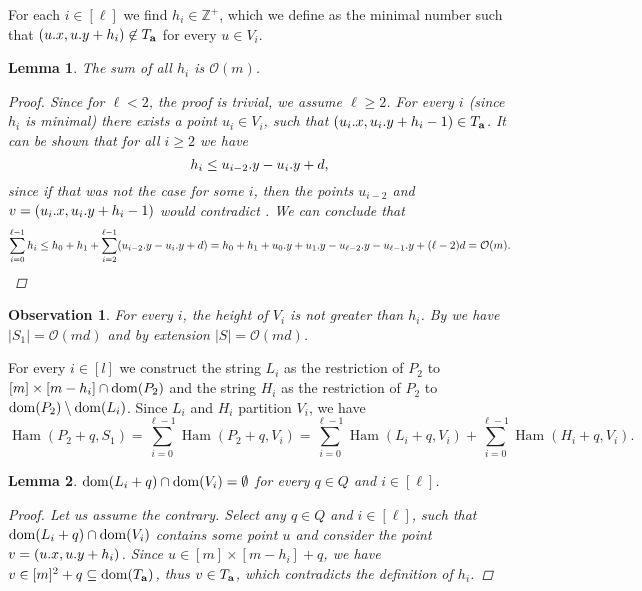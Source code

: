 \documentclass[11pt]{article}
\newcommand{\Z}{\mathbb{Z}}
\renewcommand{\O}{\mathcal{O}}
\theoremstyle{plain}
\newtheorem{lemma}{Lemma}
\newtheorem{observation}{Observation}
\theoremstyle{definition}
\theoremstyle{remark}
\DeclareMathOperator*{\Ham}{Ham}
\begin{document}
For each $i \in [\ell]$ we find $h_i \in \Z^+$, which we define as the minimal number such that $(u.x, u.y + h_i) \not \in T_\mathbf{a}$ for every $u \in V_i$.

\begin{lemma}\label{sum_of_h}
	The sum of all $h_i$ is $\O(m)$.
	\begin{proof}
		Since for $\ell < 2$, the proof is trivial, we assume $\ell \ge 2$.
		For every $i$ (since $h_i$ is minimal) there exists a point $u_i \in V_i$, such that $(u_i.x, u_i.y + h_i - 1) \in T_\mathbf{a}$.
		It can be shown that for all $i \ge 2$ we have
		$$ h_{i} \le u_{i - 2}.y - u_{i}.y + d,$$
		since if that was not the case for some $i$, then the points $u_{i - 2}$ and $v = (u_{i}.x, u_{i}.y + h_{i} - 1)$ would contradict .
		We can conclude that
		$$
			\sum_{i = 0}^{\ell - 1} h_i
			\le h_0 + h_1 + \sum_{i = 2}^{\ell - 1} (\y{u_{i - 2}} - \y{u_i} + d)
			= h_0 + h_1 + \y{u_0} + \y{u_1} - \y{u_{\ell - 2}} - \y{u_{\ell - 1}} + (\ell - 2)d 
			= \O(m).
		$$
	\end{proof}
\end{lemma}


\begin{observation}\label{area_bound}
	For every $i$, the height of $V_i$ is not greater than $h_i$.
	By  we have $|S_1| = \O(md)$ and by extension $|S| = \O(md)$.
\end{observation}


For every $i \in [l]$ we construct the string $L_i$ as the restriction of $P_2$ to $[m] \times [m - h_i] \cap \operatorname*{dom}(P_2)$
and the string $H_i$ as the restriction of $P_2$ to $\operatorname*{dom}(P_2) \setminus \operatorname*{dom}(L_i)$.
Since $L_i$ and $H_i$ partition $V_i$, we have
$$ \Ham(P_2 + q, S_1) = \sum_{i = 0}^{\ell - 1} \Ham(P_2 + q, V_i) = \sum_{i = 0}^{\ell - 1} \Ham(L_i + q, V_i) + \sum_{i = 0}^{\ell - 1} \Ham(H_i + q, V_i). $$

\begin{lemma}\label{pattern_height_reduction}
	$\operatorname*{dom}(L_i + q) \cap \operatorname*{dom}(V_i) = \emptyset$ for every $q \in Q$ and $i \in [\ell]$.
	\begin{proof}
		Let us assume the contrary.
		Select any $q \in Q$ and $i \in [\ell]$, such that $\operatorname*{dom}(L_i + q) \cap \operatorname*{dom}(V_i)$ 
		contains some point $u$ and consider the point $v = (u.x, u.y + h_i)$.
		Since $u \in [m] \times [m - h_i] + q$, we have $v \in [m]^2 + q \subseteq \operatorname*{dom}(T_\mathbf{a})$, thus $v \in T_\mathbf{a}$, which contradicts the definition of $h_i$.
	\end{proof}
\end{lemma}
\end{document}
